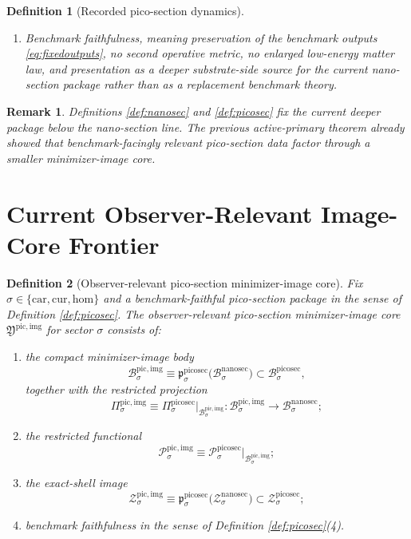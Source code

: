 \documentclass[11pt]{article}
\newcommand{\Car}{\mathrm{car}}
\newcommand{\Cur}{\mathrm{cur}}
\newcommand{\Hom}{\mathrm{hom}}
\newcommand{\NanoSectionBody}[1]{\mathcal B_{#1}^{\mathrm{nanosec}}}
\newcommand{\NanoSectionShell}[1]{\mathcal Z_{#1}^{\mathrm{nanosec}}}
\newcommand{\PicoSectionBody}[1]{\mathcal B_{#1}^{\mathrm{picosec}}}
\newcommand{\PicoSectionProj}[1]{\Pi_{#1}^{\mathrm{picosec}}}
\newcommand{\PicoSectionFiber}[2]{\mathcal F_{#1}^{\mathrm{picosec}}(#2)}
\newcommand{\PicoSectionNanoMin}[1]{\mathfrak p_{#1}^{\mathrm{picosec}}}
\newcommand{\PicoSectionFunctional}[1]{\mathscr P_{#1}^{\mathrm{picosec}}}
\newcommand{\PicoSectionShell}[1]{\mathcal Z_{#1}^{\mathrm{picosec}}}
\newcommand{\PicoImageCore}{\mathfrak Y^{\mathrm{pic,img}}}
\newcommand{\PicoImgBody}[1]{\mathcal B_{#1}^{\mathrm{pic,img}}}
\newcommand{\PicoImgProj}[1]{\Pi_{#1}^{\mathrm{pic,img}}}
\newcommand{\PicoImgFunctional}[1]{\mathscr P_{#1}^{\mathrm{pic,img}}}
\newcommand{\PicoImgShell}[1]{\mathcal Z_{#1}^{\mathrm{pic,img}}}
\newtheorem{definition}{Definition}
\newtheorem{remark}{Remark}
\begin{document}
\begin{definition}[Recorded pico-section dynamics]
\begin{enumerate}
\[\begin{array}{l}
    \PicoSectionFunctional{\sigma}(r)
    =
    \displaystyle\min_{s\in\PicoSectionFiber{\sigma}{\PicoSectionProj{\sigma}(r)}}
    \PicoSectionFunctional{\sigma}(s)
    \end{array}
    \right\},
    \]
    and
    \[
    \PicoSectionProj{\sigma}\big|_{\PicoSectionShell{\sigma}}
    :
    \PicoSectionShell{\sigma}
    \xrightarrow{\cong}
    \NanoSectionShell{\sigma}
    \]
    is a diffeomorphism.
    \item Benchmark faithfulness, meaning preservation of the benchmark outputs \eqref{eq:fixedoutputs}, no second operative metric, no enlarged low-energy matter law, and presentation as a deeper substrate-side source for the current nano-section package rather than as a replacement benchmark theory.
\end{enumerate}
\end{definition}

\begin{remark}
Definitions \ref{def:nanosec} and \ref{def:picosec} fix the current deeper package below the nano-section line. The previous active-primary theorem already showed that benchmark-facingly relevant pico-section data factor through a smaller minimizer-image core.
\end{remark}

\section{Current Observer-Relevant Image-Core Frontier}

\begin{definition}[Observer-relevant pico-section minimizer-image core]
\label{def:imagecore}
Fix \(\sigma\in\{\Car,\Cur,\Hom\}\) and a benchmark-faithful pico-section package in the sense of Definition \ref{def:picosec}. The \emph{observer-relevant pico-section minimizer-image core} \(\PicoImageCore\) for sector \(\sigma\) consists of:
\begin{enumerate}
    \item the compact minimizer-image body
    \[
    \PicoImgBody{\sigma}
    \equiv
    \PicoSectionNanoMin{\sigma}\bigl(\NanoSectionBody{\sigma}\bigr)
    \subset
    \PicoSectionBody{\sigma},
    \]
    together with the restricted projection
    \[
    \PicoImgProj{\sigma}
    \equiv
    \PicoSectionProj{\sigma}\big|_{\PicoImgBody{\sigma}}
    :
    \PicoImgBody{\sigma}\to\NanoSectionBody{\sigma};
    \]
    \item the restricted functional
    \[
    \PicoImgFunctional{\sigma}
    \equiv
    \PicoSectionFunctional{\sigma}\big|_{\PicoImgBody{\sigma}};
    \]
    \item the exact-shell image
    \[
    \PicoImgShell{\sigma}
    \equiv
    \PicoSectionNanoMin{\sigma}\bigl(\NanoSectionShell{\sigma}\bigr)
    \subset
    \PicoSectionShell{\sigma};
    \]
    \item benchmark faithfulness in the sense of Definition \ref{def:picosec}(4).
\end{enumerate}
\end{definition}
\end{document}
